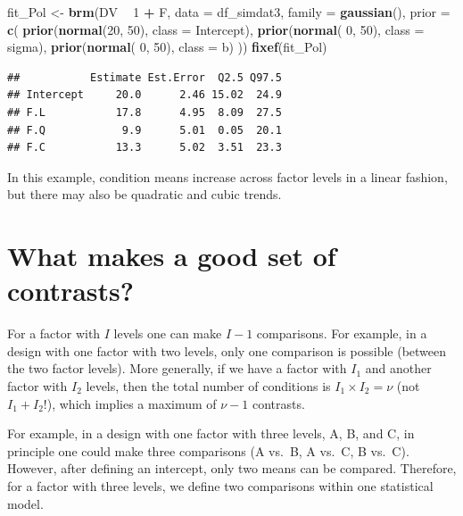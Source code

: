 \documentclass[12pt,]{krantz}
\newenvironment{Shaded}{\begin{snugshade}}{\end{snugshade}}
\newcommand{\KeywordTok}[1]{\textcolor[rgb]{0.13,0.29,0.53}{\textbf{#1}}}
\newcommand{\DataTypeTok}[1]{\textcolor[rgb]{0.13,0.29,0.53}{#1}}
\newcommand{\DecValTok}[1]{\textcolor[rgb]{0.00,0.00,0.81}{#1}}
\newcommand{\StringTok}[1]{\textcolor[rgb]{0.31,0.60,0.02}{#1}}
\newcommand{\OperatorTok}[1]{\textcolor[rgb]{0.81,0.36,0.00}{\textbf{#1}}}
\newcommand{\NormalTok}[1]{#1}
\theoremstyle{definition}
\theoremstyle{definition}
\theoremstyle{definition}
\theoremstyle{remark}
\begin{document}
\begin{Shaded}
\begin{Highlighting}[]
\NormalTok{fit_Pol <-}\StringTok{ }\KeywordTok{brm}\NormalTok{(DV }\OperatorTok{~}\StringTok{ }\DecValTok{1} \OperatorTok{+}\StringTok{ }\NormalTok{F,}
                 \DataTypeTok{data =}\NormalTok{ df_simdat3,}
                 \DataTypeTok{family =} \KeywordTok{gaussian}\NormalTok{(),}
                 \DataTypeTok{prior =} \KeywordTok{c}\NormalTok{(}
                     \KeywordTok{prior}\NormalTok{(}\KeywordTok{normal}\NormalTok{(}\DecValTok{20}\NormalTok{, }\DecValTok{50}\NormalTok{), }\DataTypeTok{class =}\NormalTok{ Intercept),}
                     \KeywordTok{prior}\NormalTok{(}\KeywordTok{normal}\NormalTok{( }\DecValTok{0}\NormalTok{, }\DecValTok{50}\NormalTok{), }\DataTypeTok{class =}\NormalTok{ sigma),}
                     \KeywordTok{prior}\NormalTok{(}\KeywordTok{normal}\NormalTok{( }\DecValTok{0}\NormalTok{, }\DecValTok{50}\NormalTok{), }\DataTypeTok{class =}\NormalTok{ b)}
\NormalTok{                 )) }
\KeywordTok{fixef}\NormalTok{(fit_Pol)}
\end{Highlighting}
\end{Shaded}

\begin{verbatim}
##           Estimate Est.Error  Q2.5 Q97.5
## Intercept     20.0      2.46 15.02  24.9
## F.L           17.8      4.95  8.09  27.5
## F.Q            9.9      5.01  0.05  20.1
## F.C           13.3      5.02  3.51  23.3
\end{verbatim}

In this example, condition means increase across factor levels in a
linear fashion, but there may also be quadratic and cubic trends.

\section{What makes a good set of contrasts?}\label{nonOrthogonal}

For a factor with \(I\) levels one can make \(I-1\) comparisons. For
example, in a design with one factor with two levels, only one
comparison is possible (between the two factor levels). More generally,
if we have a factor with \(I_1\) and another factor with \(I_2\) levels,
then the total number of conditions is \(I_1\times I_2 = \nu\) (not
\(I_1 + I_2\)!), which implies a maximum of \(\nu-1\) contrasts.

For example, in a design with one factor with three levels, A, B, and C,
in principle one could make three comparisons (A vs.~B, A vs.~C, B
vs.~C). However, after defining an intercept, only two means can be
compared. Therefore, for a factor with three levels, we define two
comparisons within one statistical model.
\end{document}
